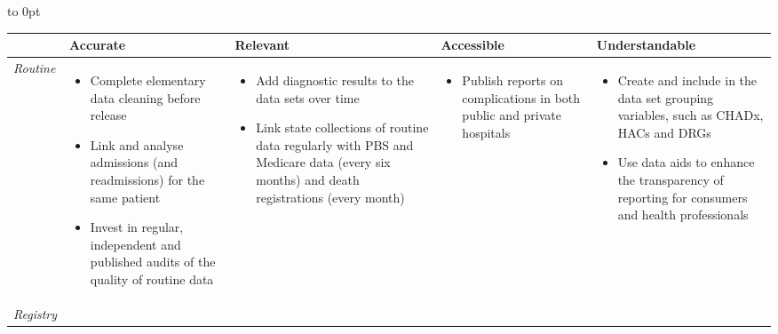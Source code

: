 \documentclass[FrontPage]{grattan}
\begin{document}
\newcommand*{\rowHeight}{-0.5ex}%
\onecolumn\vtop to 0pt\bgroup\vspace{-24.5pt}\label{chap:recs}\egroup\vspace{\baselineskip}
\begin{longtable}{@{}>{\itshape}p{1.2cm}p{5.4cm}p{5.6cm}p{5.35cm}p{5.4cm}}
\toprule
   & \textbf{Accurate} & \textbf{Relevant} & \textbf{Accessible} & \textbf{Understandable} \\
    \midrule
    Routine & \vspace{-2.5ex}\begin{itemize}[noitemsep,topsep=0pt,leftmargin=*]
        \item Complete elementary data cleaning before release
        \item Link and analyse admissions (and readmissions) for the same patient
        \item Invest in regular, independent and published audits of the quality of routine data
    \end{itemize} & \vspace{-2.5ex}\begin{itemize}[noitemsep,topsep=0pt,leftmargin=*]
        \item Add diagnostic results to the data sets over time
        \item Link state collections of routine data regularly with PBS and Medicare data (every six months) and death registrations (every month)
    \end{itemize} & \vspace{-2.5ex}\begin{itemize}[noitemsep,topsep=0pt,leftmargin=*]
        \item Publish reports on complications in both public and private hospitals
    \end{itemize}  & \vspace{-2.5ex}\begin{itemize}[noitemsep,topsep=0pt,leftmargin=*]
        \item Create and include in the data set grouping variables, such as CHADx, HACs and DRGs
        \item Use data aids to enhance the transparency of reporting for consumers and health professionals
    \end{itemize}  \\ 
%    
    Registry & \vspace{-2.5ex}\begin{itemize}[noitemsep,topsep=0pt,leftmargin=*]

\end{itemize}
\end{longtable}
\end{document}
